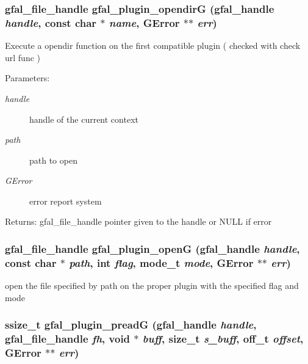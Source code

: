 \subsubsection{\setlength{\rightskip}{0pt plus 5cm}gfal\_\-file\_\-handle gfal\_\-plugin\_\-opendir\-G (gfal\_\-handle {\em handle}, const char $\ast$ {\em name}, GError $\ast$$\ast$ {\em err})}\label{gfal__common__plugin_8h_0f8363d00d0f3418edaef414a84df034}


Execute a opendir function on the first compatible plugin ( checked with check url func ) \begin{Desc}
\item[Parameters:]
\begin{description}
\item[{\em handle}]handle of the current context \item[{\em path}]path to open \item[{\em GError}]error report system \end{description}
\end{Desc}
\begin{Desc}
\item[Returns:]gfal\_\-file\_\-handle pointer given to the handle or NULL if error \end{Desc}
\subsubsection{\setlength{\rightskip}{0pt plus 5cm}gfal\_\-file\_\-handle gfal\_\-plugin\_\-open\-G (gfal\_\-handle {\em handle}, const char $\ast$ {\em path}, int {\em flag}, mode\_\-t {\em mode}, GError $\ast$$\ast$ {\em err})}\label{gfal__common__plugin_8h_322dfbe0ad1e144573719ed08151281e}


open the file specified by path on the proper plugin with the specified flag and mode 
\subsubsection{\setlength{\rightskip}{0pt plus 5cm}ssize\_\-t gfal\_\-plugin\_\-pread\-G (gfal\_\-handle {\em handle}, gfal\_\-file\_\-handle {\em fh}, void $\ast$ {\em buff}, size\_\-t {\em s\_\-buff}, off\_\-t {\em offset}, GError $\ast$$\ast$ {\em err})}\label{gfal__common__plugin_8h_fcf8bb3dbf51a9b85e7ce27542cf928b}


